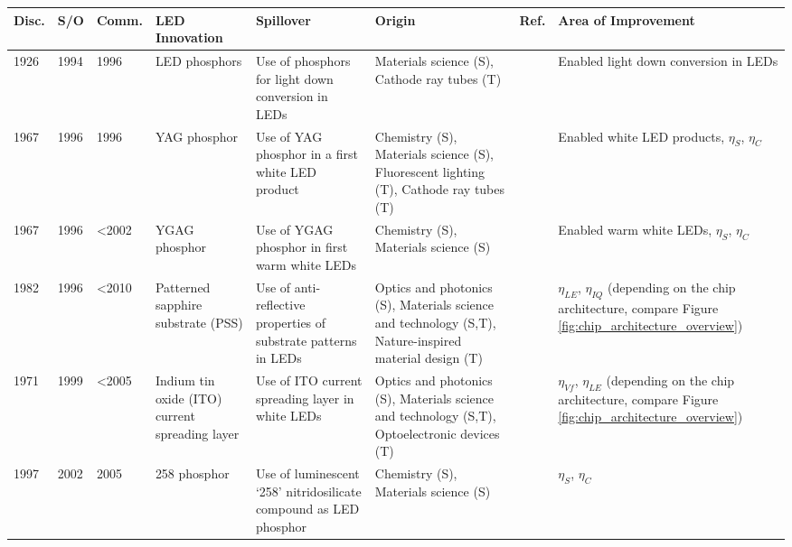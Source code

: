 \documentclass[twoside,twocolumn,9pt]{article}
\begin{document}
\begin{table}[h]
    \small
    \centering
    \begin{tabularx}{\textwidth}{|l|l|l|X|X|X|l|X|}
    \hline
        \textbf{Disc.} & \textbf{S/O} & \textbf{Comm.} & \textbf{LED Innovation} & \textbf{Spillover} & \textbf{Origin} & \textbf{Ref.} & \textbf{Area of Improvement} \\ \hline
        1926 & 1994 & 1996 & LED phosphors & Use of phosphors for light down conversion in LEDs & Materials science (S), Cathode ray tubes (T) & \cite{bright1972electric}\cite{shimizu1994sheet}\cite{cho2017white} & Enabled light down conversion in LEDs \\ \hline
        1967 & 1996 & 1996 & YAG phosphor & Use of YAG phosphor in a first white LED product & Chemistry (S), Materials science (S), Fluorescent lighting (T), Cathode ray tubes (T) & \cite{blasse1967new}\cite{bando1996}\cite{bando1998development}\cite{shimizu1999light}\cite{cho2017white} & Enabled white LED products, $\eta_S$, $\eta_C$ \\ \hline
        1967 & 1996 & <2002 & YGAG phosphor & Use of YGAG phosphor in first warm white LEDs & Chemistry (S), Materials science (S) &\cite{holloway1969optical}\cite{bando1998development}\cite{shimizu1999light}\cite{Mueller2002} & Enabled warm white LEDs, $\eta_S$, $\eta_C$ \\ \hline
        1982 & 1996 & <2010 & Patterned sapphire substrate (PSS) & Use of anti-reflective properties of substrate patterns in LEDs & Optics and photonics (S), Materials science and technology (S,T), Nature-inspired material design (T) &\cite{moharam1982diffraction}\cite{krames1998ordered}\cite{feezell2018invention}\cite{Narukawa_2010} & $\eta_{LE}$, $\eta_{IQ}$ (depending on the chip architecture, compare Figure \ref{fig:chip_architecture_overview})\\ \hline
        1971 & 1999 & <2005 & Indium tin oxide (ITO) current spreading layer & Use of ITO current spreading layer in white LEDs & Optics and photonics (S), Materials science and technology (S,T), Optoelectronic devices (T) & \cite{vossen1971rf}\cite{fraser1972highly}\cite{margalith1999indium} & $\eta_{Vf}$, $\eta_{LE}$ (depending on the chip architecture, compare Figure \ref{fig:chip_architecture_overview}) \\ \hline
        1997 & 2002 & 2005 & 258 phosphor & Use of luminescent ‘258’ nitridosilicate compound as LED phosphor & Chemistry (S), Materials science (S) &\cite{Huppertz1997}\cite{mueller2004phosphor}\cite{MuellerMach2005} & $\eta_S$, $\eta_C$ \\ \hline

\end{tabularx}
\end{table}
\end{document}

